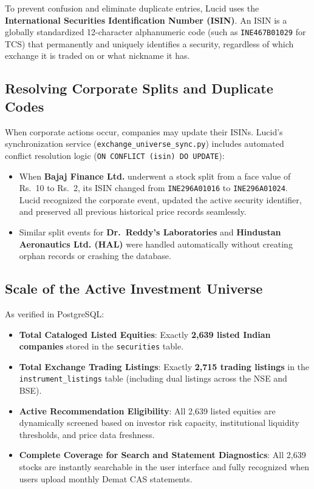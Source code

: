 To prevent confusion and eliminate duplicate entries, Lucid uses the \textbf{International Securities Identification Number (ISIN)}. An ISIN is a globally standardized 12-character alphanumeric code (such as \texttt{INE467B01029} for TCS) that permanently and uniquely identifies a security, regardless of which exchange it is traded on or what nickname it has.

\subsection{Resolving Corporate Splits and Duplicate Codes}
When corporate actions occur, companies may update their ISINs. Lucid's synchronization service (\texttt{exchange\_universe\_sync.py}) includes automated conflict resolution logic (\texttt{ON CONFLICT (isin) DO UPDATE}):
\begin{itemize}
    \item When \textbf{Bajaj Finance Ltd.} underwent a stock split from a face value of Rs.~10 to Rs.~2, its ISIN changed from \texttt{INE296A01016} to \texttt{INE296A01024}. Lucid recognized the corporate event, updated the active security identifier, and preserved all previous historical price records seamlessly.
    \item Similar split events for \textbf{Dr.~Reddy's Laboratories} and \textbf{Hindustan Aeronautics Ltd. (HAL)} were handled automatically without creating orphan records or crashing the database.
\end{itemize}

\subsection{Scale of the Active Investment Universe}
As verified in PostgreSQL:
\begin{itemize}
    \item \textbf{Total Cataloged Listed Equities}: Exactly \textbf{2,639 listed Indian companies} stored in the \texttt{securities} table.
    \item \textbf{Total Exchange Trading Listings}: Exactly \textbf{2,715 trading listings} in the \texttt{instrument\_listings} table (including dual listings across the NSE and BSE).
    \item \textbf{Active Recommendation Eligibility}: All 2,639 listed equities are dynamically screened based on investor risk capacity, institutional liquidity thresholds, and price data freshness.
    \item \textbf{Complete Coverage for Search and Statement Diagnostics}: All 2,639 stocks are instantly searchable in the user interface and fully recognized when users upload monthly Demat CAS statements.
\end{itemize}

